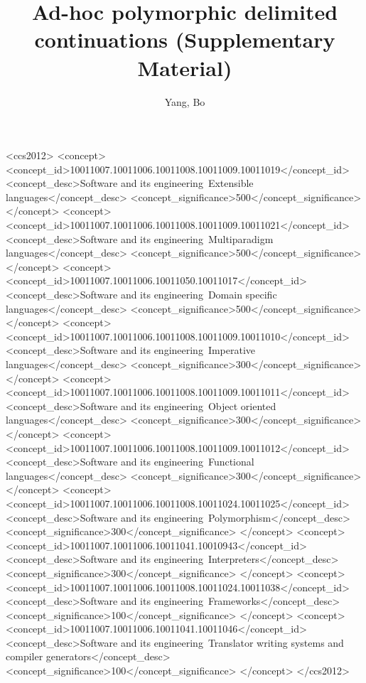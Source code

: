 \documentclass[acmsmall,10pt,review,screen,anonymous]{acmart}
\begin{document}
\title{Ad-hoc polymorphic delimited continuations (Supplementary Material)}

\author{Yang, Bo}




%
%
\begin{CCSXML}
<ccs2012>
<concept>
<concept_id>10011007.10011006.10011008.10011009.10011019</concept_id>
<concept_desc>Software and its engineering~Extensible languages</concept_desc>
<concept_significance>500</concept_significance>
</concept>
<concept>
<concept_id>10011007.10011006.10011008.10011009.10011021</concept_id>
<concept_desc>Software and its engineering~Multiparadigm languages</concept_desc>
<concept_significance>500</concept_significance>
</concept>
<concept>
<concept_id>10011007.10011006.10011050.10011017</concept_id>
<concept_desc>Software and its engineering~Domain specific languages</concept_desc>
<concept_significance>500</concept_significance>
</concept>
<concept>
<concept_id>10011007.10011006.10011008.10011009.10011010</concept_id>
<concept_desc>Software and its engineering~Imperative languages</concept_desc>
<concept_significance>300</concept_significance>
</concept>
<concept>
<concept_id>10011007.10011006.10011008.10011009.10011011</concept_id>
<concept_desc>Software and its engineering~Object oriented languages</concept_desc>
<concept_significance>300</concept_significance>
</concept>
<concept>
<concept_id>10011007.10011006.10011008.10011009.10011012</concept_id>
<concept_desc>Software and its engineering~Functional languages</concept_desc>
<concept_significance>300</concept_significance>
</concept>
<concept>
<concept_id>10011007.10011006.10011008.10011024.10011025</concept_id>
<concept_desc>Software and its engineering~Polymorphism</concept_desc>
<concept_significance>300</concept_significance>
</concept>
<concept>
<concept_id>10011007.10011006.10011041.10010943</concept_id>
<concept_desc>Software and its engineering~Interpreters</concept_desc>
<concept_significance>300</concept_significance>
</concept>
<concept>
<concept_id>10011007.10011006.10011008.10011024.10011038</concept_id>
<concept_desc>Software and its engineering~Frameworks</concept_desc>
<concept_significance>100</concept_significance>
</concept>
<concept>
<concept_id>10011007.10011006.10011041.10011046</concept_id>
<concept_desc>Software and its engineering~Translator writing systems and compiler generators</concept_desc>
<concept_significance>100</concept_significance>
</concept>
</ccs2012>
\end{CCSXML}
\end{document}
